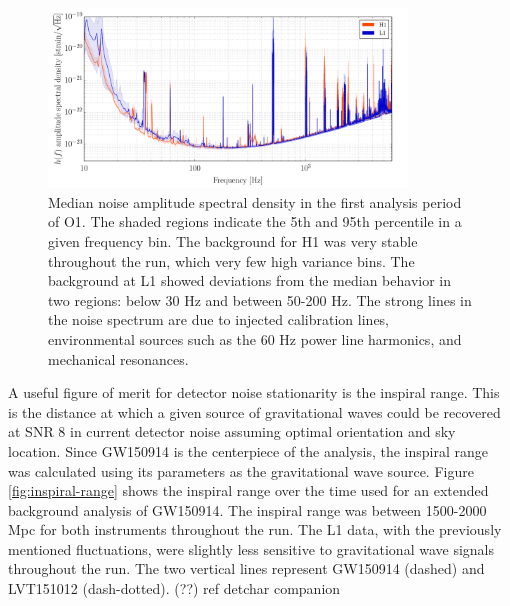 \begin{figure}[ht!]%
\includegraphics[width=0.85\textwidth]{figures/O1/H1L1-OBSERVING_GW150914_PERCENTILE_SPECTRUM-1126073342-3309798}
\caption[Median noise ASD in O1]{Median noise amplitude spectral density %
         in the first analysis period of O1. The shaded regions indicate %
         the 5th and 95th percentile in a given frequency bin. The background %
         for H1 was very stable throughout the run, which very few high %
         variance bins. The background at L1 showed deviations from the %
         median behavior in two regions: below 30 Hz and between 50-200 Hz. %
         The strong lines in the noise spectrum are due to injected calibration %
         lines, environmental sources such as the 60 Hz power line harmonics, %
         and mechanical resonances.
         }
\label{fig:median-asd}
\end{figure}

A useful figure of merit for detector noise stationarity is the 
inspiral range. This is the distance at which a given source 
of gravitational waves 
could be recovered at SNR 8 in current detector noise assuming 
optimal orientation and sky location. Since GW150914 is the 
centerpiece of the analysis, the inspiral range was calculated using 
its parameters as the gravitational wave source. Figure \ref{fig:inspiral-range} 
shows 
the inspiral range over the time used for an extended background 
analysis of GW150914. The inspiral range was between 1500-2000 Mpc 
for both instruments throughout the run. The L1 data, with the 
previously mentioned fluctuations, were slightly less sensitive to 
gravitational wave signals throughout the run. The two vertical lines 
represent GW150914 (dashed) and LVT151012 (dash-dotted). (??) ref 
detchar companion

